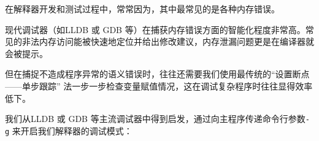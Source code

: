 在解释器开发和测试过程中，常常因为，其中最常见的是各种内存错误。

现代调试器（如LLDB 或 GDB
等）在捕获内存错误方面的智能化程度非常高。常见的非法内存访问能被快速地定位并给出修改建议，内存泄漏问题更是在编译器就会被提示。

但在捕捉不造成程序异常的语义错误时，往往还需要我们使用最传统的``设置断点------单步跟踪''
法一步一步检查变量赋值情况，这在调试复杂程序时往往显得效率低下。

我们从LLDB 或 GDB
等主流调试器中得到启发，通过向主程序传递命令行参数\texttt{-g}
来开启我们解释器的调试模式：

\begin{Shaded}
\begin{Highlighting}[]
\OperatorTok{(}\OperatorTok{*}\OperatorTok{,} \OperatorTok{**}\OperatorTok{)}
\OperatorTok{\{}
     \OperatorTok{(}\OperatorTok{=} \OperatorTok{;}\OperatorTok{\textless{}} \OperatorTok{*}\OperatorTok{;}\OperatorTok{++)} \OperatorTok{\{}
         \OperatorTok{(}\OperatorTok{[}\OperatorTok{][}\OperatorTok{]} \OperatorTok{==} \CharTok{\textquotesingle{}{-}\textquotesingle{}}\OperatorTok{)} \OperatorTok{\{}
            \OperatorTok{*}\OperatorTok{=} \OperatorTok{*}\OperatorTok{{-}} \OperatorTok{;}
             \OperatorTok{(}\OperatorTok{[}\OperatorTok{][}\OperatorTok{]} \OperatorTok{==} \OperatorTok{)} \OperatorTok{\{}
\OperatorTok{=}\OperatorTok{;}
\OperatorTok{();}
            \OperatorTok{\}}  \OperatorTok{\{}
\OperatorTok{(}\OperatorTok{);}
            \OperatorTok{\}}
             \OperatorTok{(}\OperatorTok{=}\OperatorTok{;}\OperatorTok{\textless{}=} \OperatorTok{*}\OperatorTok{;} \OperatorTok{++}\OperatorTok{)} \OperatorTok{\{}
\OperatorTok{[}\OperatorTok{]} \OperatorTok{=}\OperatorTok{[}\OperatorTok{+} \OperatorTok{];}
            \OperatorTok{\}}
        \OperatorTok{\}}
    \OperatorTok{\}}
\OperatorTok{\}}
\end{Highlighting}
\end{Shaded}


